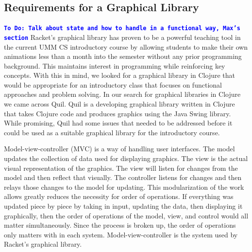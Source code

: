 \documentclass[12pt]{article}
\newcommand{\comment}[1]{{\bf \tt  {#1}}}
\newcommand{\todo}[1]{\textcolor{blue}{\comment{To Do: {#1}}}}
\begin{document}
\subsection{Requirements for a Graphical Library}\label{subsec:requirements}
\todo{Talk about state and how to handle in a functional way, Max's section}
Racket's graphical library has proven to be a powerful teaching tool in the current UMM CS introductory course by allowing students to make their own animations less than a month into the semester without any prior programming background. This maintains interest in programming while reinforcing key concepts. With this in mind, we looked for a graphical library in Clojure that would be appropriate for an introductory class that focuses on functional approaches and problem solving. In our search for graphical libraries in Clojure we came across Quil. Quil is a developing graphical library written in Clojure that takes Clojure code and produces graphics using the Java Swing library. While promising, Quil had some issues that needed to be addressed before it could be used as a suitable graphical library for the introductory course.

Model-view-controller (MVC) is a way of handling user interfaces. The model updates the collection of data used for displaying graphics. The view is the actual visual representation of the graphics. The view will listen for changes from the model and then reflect that visually. The controller listens for changes and then relays those changes to the model for updating. This modularization of the work allows greatly reduces the necessity for order of operations. If everything was updated piece by piece by taking in input, updating the data, then displaying it graphically, then the order of operations of the model, view, and control would all matter simultaneously. Since the process is broken up, the order of operations only matters with in each system. Model-view-controller is the system used by Racket's graphical library.
\end{document}

